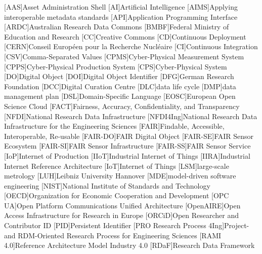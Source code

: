 

\begin{acronym}[JSONP]\itemsep0pt
[AAS]{Asset Administration Shell}
[AI]{Artificial Intelligence}
[AIMS]{Applying interoperable metadata standards}
[API]{Application Programming Interface}
[ARDC]{Australian Research Data Commons}
[BMBF]{Federal Ministry of Education and Research}
[CC]{Creative Commons}
[CD]{Continuous Deployment}
[CERN]{Conseil Européen pour la Recherche Nucléaire}
[CI]{Continuous Integration}
[CSV]{Comma-Separated Values}
[CPMS]{Cyber-Physical Measurement System}
[CPPS]{Cyber-Physical Production System}
[CPS]{Cyber-Physical System}
[DO]{Digital Object}
[DOI]{Digital Object Identifier}
[DFG]{German Research Foundation}
[DCC]{Digital Curation Centre}
[DLC]{data life cycle}
[DMP]{data management plan}
[DSL]{Domain-Specific Language}
[EOSC]{European Open Science Cloud}
[FACT]{Fairness, Accuracy, Confidentiality, and Transparency}
[NFDI]{National Research Data Infrastructure}
[NFDI4Ing]{National Research Data Infrastructure for the Engineering Sciences}
[FAIR]{Findable, Accessible, Interoperable, Re-usable}
[FAIR-DO]{FAIR Digital Object}
[FAIR-SE]{FAIR Sensor Ecosystem}
[FAIR-SI]{FAIR Sensor Infrastructure}
[FAIR-SS]{FAIR Sensor Service}
[IoP]{Internet of Production}
[IIoT]{Industrial Internet of Things}
[IIRA]{Industrial Internet Reference Architecture}
[IoT]{Internet of Things}
[LSM]{large-scale metrology}
[LUH]{Leibniz University Hannover}
[MDE]{model-driven software engineering}
[NIST]{National Institute of Standards and Technology}
[OECD]{Organization for Economic Cooperation and Development}
[OPC UA]{Open Platform Communications Unified Architecture}
[OpenAIRE]{Open Access Infrastructure for Research in Europe}
[ORCiD]{Open Researcher and Contributor ID}
[PID]{Persistent Identifier}
[PRO\allowbreak{} Research\allowbreak{} Process\allowbreak{} 4Ing]{Project-\allowbreak{} and\allowbreak{} RDM-Oriented\allowbreak{} Research Process\allowbreak{} for\allowbreak{} Engineering Sciences}
[RAMI 4.0]{Reference Architecture Model Industry 4.0}
[RDaF]{Research Data Framework}

\end{acronym}
